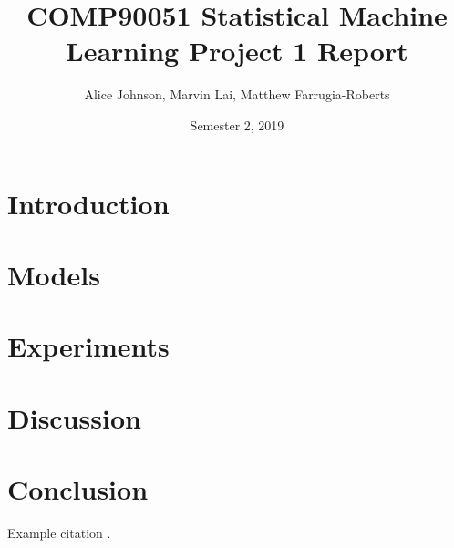 \documentclass[twocolumn,10pt]{article}
\title{COMP90051 Statistical Machine Learning Project 1 Report}
\author{
Alice Johnson,
Marvin Lai,
Matthew Farrugia-Roberts}
\date{Semester 2, 2019}
\begin{document}
\maketitle


\section{Introduction}

\lipsum[2]
\lipsum[3]

\section{Models}

\lipsum[1]
\lipsum[2]
\lipsum[3]
\lipsum[4]

\section{Experiments}

\lipsum[5]
\lipsum[4]
\lipsum[1]
\lipsum[2]
\lipsum[5]
\lipsum[4]
\lipsum[4]
\lipsum[1]
\lipsum[2]
\lipsum[5]
\lipsum[4]

\section{Discussion}

\lipsum[4]
\lipsum[1]
\lipsum[2]
\lipsum[5]
\lipsum[3]

\section{Conclusion}

\lipsum[6]

Example citation \cite{rocha2016authorship} \cite{layton2013automated} \cite{layton2010authorship} \cite{bhargava2013stylometric} \cite{schwartz2013authorship} \cite{layton2012recentred}.


{}
\end{document}
